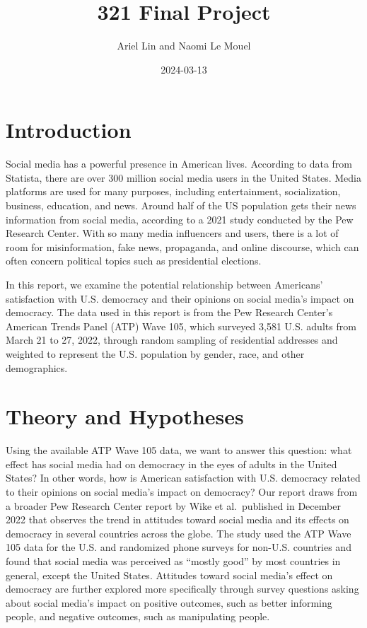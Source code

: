 \documentclass[
]{article}
\title{321 Final Project}
\author{Ariel Lin and Naomi Le Mouel}
\date{2024-03-13}
\begin{document}
\maketitle

\hypertarget{introduction}{%
\section{Introduction}\label{introduction}}

Social media has a powerful presence in American lives. According to
data from Statista, there are over 300 million social media users in the
United States. Media platforms are used for many purposes, including
entertainment, socialization, business, education, and news. Around half
of the US population gets their news information from social media,
according to a 2021 study conducted by the Pew Research Center. With so
many media influencers and users, there is a lot of room for
misinformation, fake news, propaganda, and online discourse, which can
often concern political topics such as presidential elections.

In this report, we examine the potential relationship between Americans'
satisfaction with U.S. democracy and their opinions on social media's
impact on democracy. The data used in this report is from the Pew
Research Center's American Trends Panel (ATP) Wave 105, which surveyed
3,581 U.S. adults from March 21 to 27, 2022, through random sampling of
residential addresses and weighted to represent the U.S. population by
gender, race, and other demographics.

\hypertarget{theory-and-hypotheses}{%
\section{Theory and Hypotheses}\label{theory-and-hypotheses}}

Using the available ATP Wave 105 data, we want to answer this question:
what effect has social media had on democracy in the eyes of adults in
the United States? In other words, how is American satisfaction with
U.S. democracy related to their opinions on social media's impact on
democracy? Our report draws from a broader Pew Research Center report by
Wike et al.~published in December 2022 that observes the trend in
attitudes toward social media and its effects on democracy in several
countries across the globe. The study used the ATP Wave 105 data for the
U.S. and randomized phone surveys for non-U.S. countries and found that
social media was perceived as ``mostly good'' by most countries in
general, except the United States. Attitudes toward social media's
effect on democracy are further explored more specifically through
survey questions asking about social media's impact on positive
outcomes, such as better informing people, and negative outcomes, such
as manipulating people.
\end{document}
